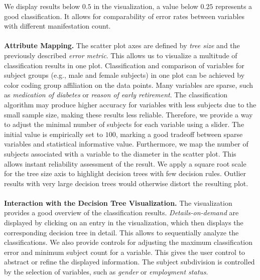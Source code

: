 \documentclass[a4paper,twoside]{style/article}
\begin{document}
We display results below $0.5$ in the visualization, a value below $0.25$ represents a good classification.
It allows for comparability of error rates between variables with different manifestation count.
\\\\
\textbf{Attribute Mapping.}
The scatter plot axes are defined by \emph{tree size} and the previously described \emph{error metric}.
This allows us to visualize a multitude of classification results in one plot.
Classification and comparison of variables for subject groups (e.g., male and female subjects) in one plot can be achieved by color coding group affiliation on the data points.
Many variables are sparse, such as \emph{medication of diabetes} or \emph{reason of early retirement}.
The classification algorithm may produce higher accuracy for variables with less subjects due to the small sample size, making these results less reliable.
Therefore, we provide a way to adjust the minimal number of subjects for each variable using a slider.
The initial value is empirically set to $100$, marking a good tradeoff between sparse variables and statistical informative value.
Furthermore, we map the number of subjects associated with a variable to the diameter in the scatter plot.
This allows instant reliability assessment of the result.
We apply a square root scale for the tree size axis to highlight decision trees with few decision rules.
Outlier results with very large decision trees would otherwise distort the resulting plot.
\\\\
\noindent \textbf{Interaction with the Decision Tree Visualization.}
The visualization provides a good overview of the classification results.
\emph{Details-on-demand} are displayed by clicking on an entry in the visualization, which then displays the corresponding decision tree in detail.
This allows to sequentially analyze the classifications.
We also provide controls for adjusting the maximum classification error and minimum subject count for a variable.
This gives the user control to abstract or refine the displayed information.
The subject subdivision is controlled by the selection of variables, such as \emph{gender} or \emph{employment status}.
\end{document}
